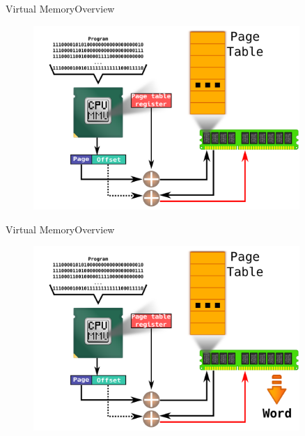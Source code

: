 \documentclass[10pt]{beamer}
\begin{document}
\begin{frame}{Virtual Memory}{Overview}
  \begin{figure}[ht]
    \centering
    \includegraphics[width=0.9\textwidth, keepaspectratio=true]{images/mmu_e.png}
  \end{figure}
\end{frame}

\begin{frame}{Virtual Memory}{Overview}
  \begin{figure}[ht]
    \centering
    \includegraphics[width=0.9\textwidth, keepaspectratio=true]{images/mmu_f.png}
  \end{figure}
\end{frame}
\end{document}
